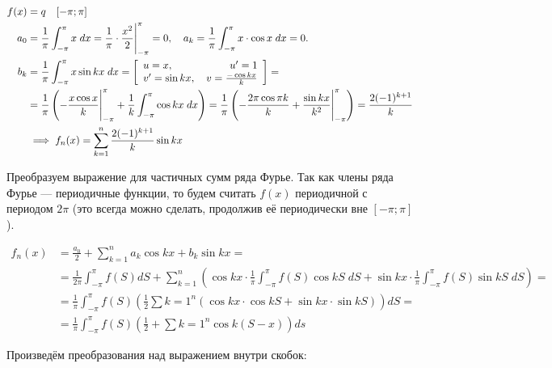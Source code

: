 \begin{example}
    \begin{align*}
        f(x) &= q \quad [-\pi;\pi] \\
        a_0 &= \frac{1}{\pi} \displaystyle\int_{-\pi}^\pi x \; dx = 
        \frac{1}{\pi} \cdot \frac{x^2}{2} \Bigg|_{-\pi}^\pi = 0, \quad
        a_k = \frac{1}{\pi} \displaystyle\int_{-\pi}^\pi x \cdot \cos x \; dx = 0. \\
        b_k &= \frac{1}{\pi} \displaystyle\int_{-\pi}^\pi x \sin kx \; dx = \left[ \begin{array}{lr}
            u = x, \, &u' = 1 \\
            v' = \sin kx, \, &v = \frac{-\cos kx}{k}
        \end{array} \right] = \\
        &= \frac{1}{\pi} \left( -\frac{x \cos x}{k} \Bigg|_{-\pi}^\pi + 
        \frac{1}{k} \displaystyle\int_{-\pi}^\pi \cos kx \; dx \right) =
        \frac{1}{\pi} \left( -\frac{2 \pi \cos \pi k}{k} + \frac{\sin kx}{k^2} \Bigg|_{-\pi}^\pi \right) =
        \frac{2 (-1)^{k + 1}}{k} \\
        &\implies f_n(x) = \displaystyle\sum_{k = 1}^n \frac{2 (-1)^{k + 1}}{k} \sin kx
    \end{align*}

    Преобразуем выражение для частичных сумм ряда Фурье. Так как члены ряда
    Фурье --- периодичные функции, то будем считать $f(x)$ периодичной с
    периодом $2\pi$ (это всегда можно сделать, продолжив её периодически
    вне $[-\pi; \pi]$).

    \begin{align*}
        f_n(x) &= \frac{a_0}{2} + \sum_{k = 1}^n a_k \cos kx + b_k \sin kx = \\
        &= \frac{1}{2\pi} \int_{-\pi}^\pi f(S) dS + \sum_{k = 1}^n \left(
        \cos kx \cdot \frac{1}{\pi} \int_{-\pi}^\pi f(S) \cos kS \; dS +
        \sin kx \cdot \frac{1}{\pi} \int_{-\pi}^\pi f(S) \sin kS \; dS \right) = \\
        &= \frac{1}{\pi} \int_{-\pi}^\pi f(S) \left( \frac{1}{2} \sum{k = 1}^n
        \left( \cos kx \cdot \cos kS + \sin kx \cdot \sin kS \right) \right) dS = \\
        &= \frac{1}{\pi} \int_{-\pi}^\pi f(S) \left( \frac{1}{2} + \sum{k = 1}^n
        \cos k (S - x) \right) ds
    \end{align*}

    Произведём преобразования над выражением внутри скобок:


\end{example}
